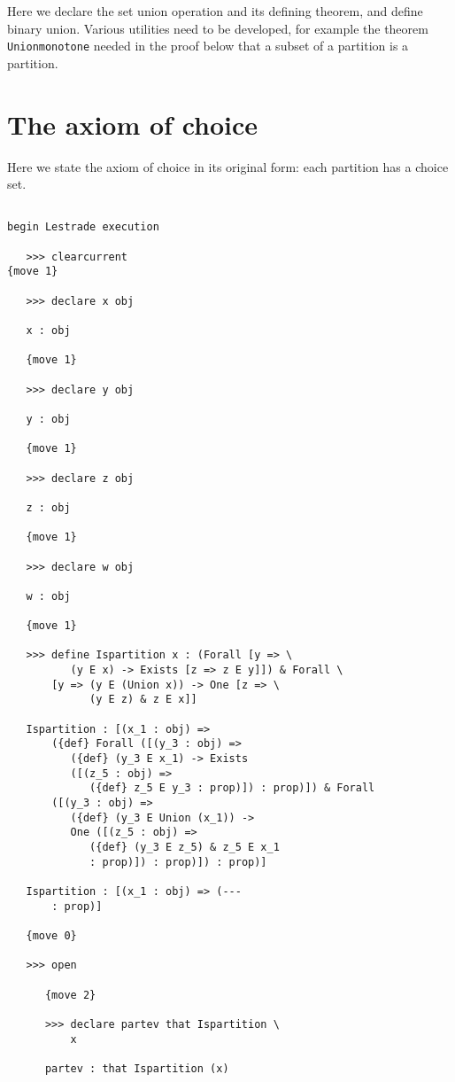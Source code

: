 \documentclass[12pt]{article}
\begin{document}
Here we declare the set union operation and its defining theorem, and define binary union.  Various utilities need to be developed, for example the theorem
{\tt Unionmonotone} needed in the proof below that a subset of a partition is a partition.

\section{The axiom of choice}

Here we state the axiom of choice in its original form:  each partition has a choice set.

\begin{verbatim}

begin Lestrade execution

   >>> clearcurrent
{move 1}

   >>> declare x obj

   x : obj

   {move 1}

   >>> declare y obj

   y : obj

   {move 1}

   >>> declare z obj

   z : obj

   {move 1}

   >>> declare w obj

   w : obj

   {move 1}

   >>> define Ispartition x : (Forall [y => \
          (y E x) -> Exists [z => z E y]]) & Forall \
       [y => (y E (Union x)) -> One [z => \
             (y E z) & z E x]]

   Ispartition : [(x_1 : obj) => 
       ({def} Forall ([(y_3 : obj) => 
          ({def} (y_3 E x_1) -> Exists 
          ([(z_5 : obj) => 
             ({def} z_5 E y_3 : prop)]) : prop)]) & Forall 
       ([(y_3 : obj) => 
          ({def} (y_3 E Union (x_1)) -> 
          One ([(z_5 : obj) => 
             ({def} (y_3 E z_5) & z_5 E x_1 
             : prop)]) : prop)]) : prop)]

   Ispartition : [(x_1 : obj) => (--- 
       : prop)]

   {move 0}

   >>> open

      {move 2}

      >>> declare partev that Ispartition \
          x

      partev : that Ispartition (x)


\end{verbatim}
\end{document}
